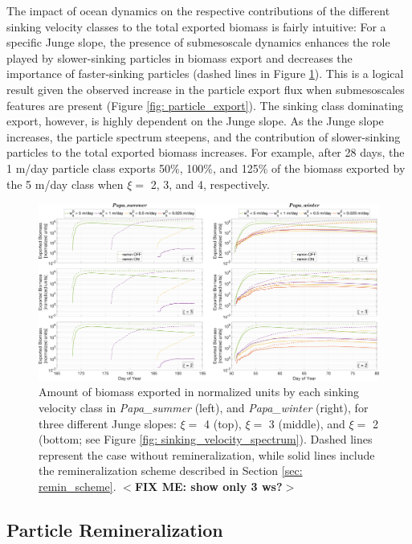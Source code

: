 \documentclass[draft,linenumbers]{agujournal2018}
\newcommand{\fixme}[1]{\color{red}$<$\textbf{FIX ME: #1}$>$\color{black}}
\begin{document}
The impact of ocean dynamics on the respective contributions of the different sinking velocity classes to the total exported biomass is fairly intuitive: For a specific Junge slope, the presence of submesoscale dynamics enhances the role played by slower-sinking particles in biomass export and decreases the importance of faster-sinking particles (dashed lines in Figure \ref{fig: biomass_export_remin}). This is a logical result given the observed increase in the particle export flux when submesoscales features are present (Figure \ref{fig: particle_export}). The sinking class dominating export, however, is highly dependent on the Junge slope. As the Junge slope increases, the particle spectrum steepens, and the contribution of slower-sinking particles to the total exported biomass increases. For example, after 28 days, the 1 m/day particle class exports 50\%, 100\%, and 125\% of the biomass exported by the 5 m/day class when $\xi =$ 2, 3, and 4, respectively.

 \begin{figure}[ht]
	\centering
	\includegraphics[width = 1\linewidth]{figures/Fig7_biomass_export}
	\caption{Amount of biomass exported in normalized units by each sinking velocity class in \textit{Papa\_summer} (left), and \textit{Papa\_winter} (right), for three different Junge slopes: $\xi =$ 4 (top), $\xi =$ 3 (middle), and $\xi =$ 2 (bottom; see Figure \ref{fig: sinking_velocity_spectrum}). Dashed lines represent the case without remineralization, while solid lines include the remineralization scheme described in Section \ref{sec: remin_scheme}. \fixme{show only 3 ws?}}
	\label{fig: biomass_export_remin}
\end{figure}

 \subsection{Particle Remineralization}
 \label{sec: results_remin}
 
\end{document}
